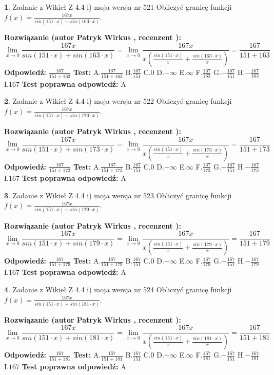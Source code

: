 \documentclass[12pt, a4paper]{article}
\theoremstyle{definition} %
\newtheorem{zad}{}
\newcommand{\zadStart}[1]{\begin{zad}#1\newline}
\newcommand{\zadStop}{\end{zad}}
\newcommand{\rozwStart}[2]{\noindent \textbf{Rozwiązanie (autor #1 , recenzent #2): }\newline}
\newcommand{\rozwStop}{\newline}
\newcommand{\odpStart}{\noindent \textbf{Odpowiedź:}\newline}
\newcommand{\odpStop}{\newline}
\newcommand{\testStart}{\noindent \textbf{Test:}\newline}
\newcommand{\testStop}{\newline}
\newcommand{\kluczStart}{\noindent \textbf{Test poprawna odpowiedź:}\newline}
\newcommand{\kluczStop}{\newline}
\begin{document}
\zadStart{Zadanie z Wikieł Z 4.4 i) moja wersja nr 521}
Obliczyć granicę funkcji $f(x)=\frac{167x}{sin(151\cdot x) +sin(163\cdot x)}$.
\zadStop
\rozwStart{Patryk Wirkus}{}
$$\lim\limits_{x\to 0}\frac{167x}{sin(151\cdot x) +sin(163\cdot x)}=\lim\limits_{x\to 0}\frac{167x}{x(\frac{sin(151\cdot x)}{x}+\frac{sin(163\cdot x)}{x})}=\frac{167}{151+163}$$
\rozwStop
\odpStart
$\frac{167}{151+163}$
\odpStop
\testStart
A.$\frac{167}{151+163}$
B.$\frac{167}{151}$
C.$0$
D.$-\infty$
E.$\infty$
F.$\frac{167}{163}$
G.$-\frac{167}{151}$
H.$-\frac{167}{163}$
I.$167$
\testStop
\kluczStart
A
\kluczStop



\zadStart{Zadanie z Wikieł Z 4.4 i) moja wersja nr 522}
Obliczyć granicę funkcji $f(x)=\frac{167x}{sin(151\cdot x) +sin(173\cdot x)}$.
\zadStop
\rozwStart{Patryk Wirkus}{}
$$\lim\limits_{x\to 0}\frac{167x}{sin(151\cdot x) +sin(173\cdot x)}=\lim\limits_{x\to 0}\frac{167x}{x(\frac{sin(151\cdot x)}{x}+\frac{sin(173\cdot x)}{x})}=\frac{167}{151+173}$$
\rozwStop
\odpStart
$\frac{167}{151+173}$
\odpStop
\testStart
A.$\frac{167}{151+173}$
B.$\frac{167}{151}$
C.$0$
D.$-\infty$
E.$\infty$
F.$\frac{167}{173}$
G.$-\frac{167}{151}$
H.$-\frac{167}{173}$
I.$167$
\testStop
\kluczStart
A
\kluczStop



\zadStart{Zadanie z Wikieł Z 4.4 i) moja wersja nr 523}
Obliczyć granicę funkcji $f(x)=\frac{167x}{sin(151\cdot x) +sin(179\cdot x)}$.
\zadStop
\rozwStart{Patryk Wirkus}{}
$$\lim\limits_{x\to 0}\frac{167x}{sin(151\cdot x) +sin(179\cdot x)}=\lim\limits_{x\to 0}\frac{167x}{x(\frac{sin(151\cdot x)}{x}+\frac{sin(179\cdot x)}{x})}=\frac{167}{151+179}$$
\rozwStop
\odpStart
$\frac{167}{151+179}$
\odpStop
\testStart
A.$\frac{167}{151+179}$
B.$\frac{167}{151}$
C.$0$
D.$-\infty$
E.$\infty$
F.$\frac{167}{179}$
G.$-\frac{167}{151}$
H.$-\frac{167}{179}$
I.$167$
\testStop
\kluczStart
A
\kluczStop



\zadStart{Zadanie z Wikieł Z 4.4 i) moja wersja nr 524}
Obliczyć granicę funkcji $f(x)=\frac{167x}{sin(151\cdot x) +sin(181\cdot x)}$.
\zadStop
\rozwStart{Patryk Wirkus}{}
$$\lim\limits_{x\to 0}\frac{167x}{sin(151\cdot x) +sin(181\cdot x)}=\lim\limits_{x\to 0}\frac{167x}{x(\frac{sin(151\cdot x)}{x}+\frac{sin(181\cdot x)}{x})}=\frac{167}{151+181}$$
\rozwStop
\odpStart
$\frac{167}{151+181}$
\odpStop
\testStart
A.$\frac{167}{151+181}$
B.$\frac{167}{151}$
C.$0$
D.$-\infty$
E.$\infty$
F.$\frac{167}{181}$
G.$-\frac{167}{151}$
H.$-\frac{167}{181}$
I.$167$
\testStop
\kluczStart
A
\kluczStop
\end{document}

